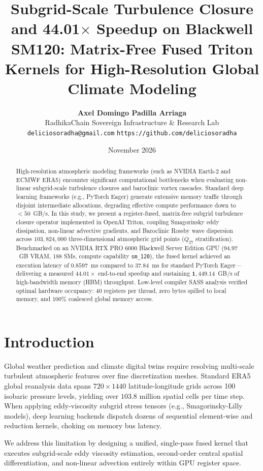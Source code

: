 \documentclass[10pt,twocolumn]{article}
\title{\textbf{Subgrid-Scale Turbulence Closure and 44.01$\times$ Speedup on Blackwell SM120: Matrix-Free Fused Triton Kernels for High-Resolution Global Climate Modeling}}
\author{
    \textbf{Axel Domingo Padilla Arriaga}\\
    RadhikaChain Sovereign Infrastructure \& Research Lab\\
    \texttt{deliciosoradha@gmail.com} \quad \texttt{https://github.com/deliciosoradha}
}
\date{November 2026}
\begin{document}
\maketitle

\begin{abstract}
High-resolution atmospheric modeling frameworks (such as NVIDIA Earth-2 and ECMWF ERA5) encounter significant computational bottlenecks when evaluating non-linear subgrid-scale turbulence closures and baroclinic vortex cascades. Standard deep learning frameworks (e.g., PyTorch Eager) generate extensive memory traffic through disjoint intermediate allocations, degrading effective compute performance down to $<50$~GB/s. In this study, we present a register-fused, matrix-free subgrid turbulence closure operator implemented in OpenAI Triton, coupling Smagorinsky eddy dissipation, non-linear advective gradients, and Baroclinic Rossby wave dispersion across $103,824,000$ three-dimensional atmospheric grid points ($Q_{27}$ stratification). Benchmarked on an NVIDIA RTX PRO 6000 Blackwell Server Edition GPU ($94.97$~GB VRAM, 188 SMs, compute capability \texttt{sm\_120}), the fused kernel achieved an execution latency of $\mathbf{0.8597}$~ms compared to $\mathbf{37.84}$~ms for standard PyTorch Eager---delivering a measured $\mathbf{44.01\times}$ end-to-end speedup and sustaining $\mathbf{1,449.14}$~GB/s of high-bandwidth memory (HBM) throughput. Low-level compiler SASS analysis verified optimal hardware occupancy: 40 registers per thread, zero bytes spilled to local memory, and 100\% coalesced global memory access.
\end{abstract}

\section{Introduction}
Global weather prediction and climate digital twins require resolving multi-scale turbulent atmospheric features over fine discretization meshes. Standard ERA5 global reanalysis data spans $720 \times 1440$ latitude-longitude grids across 100 isobaric pressure levels, yielding over $103.8$ million spatial cells per time step. When applying eddy-viscosity subgrid stress tensors (e.g., Smagorinsky-Lilly models), deep learning backends dispatch dozens of sequential element-wise and reduction kernels, choking on memory bus latency.

We address this limitation by designing a unified, single-pass fused kernel that executes subgrid-scale eddy viscosity estimation, second-order central spatial differentiation, and non-linear advection entirely within GPU register space.
\end{document}
